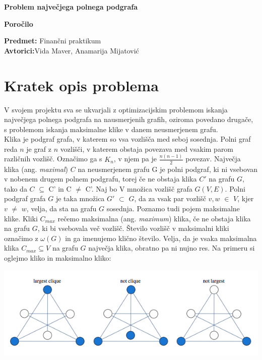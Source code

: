 \documentclass[12pt,a4paper]{amsart}
\newcommand{\naslovdela}{Problem največjega polnega podgrafa}
\newcommand{\imeavtorja}{Vida Maver, Anamarija Mijatović}
\theoremstyle{definition}
\theoremstyle{plain}
\begin{document}
\begin{center}{\large
\vspace*{\fill}
{\bf \LARGE{\naslovdela}}\\[10mm]}

\textbf{Poročilo}

\textbf{Predmet:} Finančni praktikum
\\
\textbf{Avtorici:}\imeavtorja\\[2mm]

\vspace*{\fill}
\end{center}
\pagebreak


\tableofcontents

\pagebreak

\section{Kratek opis problema}

V svojem projektu sva se ukvarjali z optimizacijskim problemom iskanja 
največjega polnega podgrafa na nausmerjenih grafih, oziroma povedano drugače, s problemom iskanja maksimalne klike v danem neusmerjenem grafu. \\

Klika je podgraf grafa, v katerem so vsa vozlišča med seboj sosednja. 
Polni graf reda $n$ je graf z $n$ vozlišči, v katerem obstaja povezava med vsakim parom različnih vozlišč. Označimo ga s $K_n$, v njem pa je $\frac{n(n - 1)}{2}$ povezav. 
Največja klika (ang. \textit{maximal}) $C$ na neusmerjenem grafu G je polni podgraf, ki ni vsebovan v nobenem drugem polnem podgrafu, torej če ne obstaja klika $C'$ na grafu $G$, tako da $C$ $\subseteq$ C' in C $\ne$ C'. 
Naj bo V množica vozlišč grafa $G(V, E)$. Polni podgraf grafa $G$ je taka množica $G'$ $\subset$ $G$, da za vsak par vozlišč $v, w$ $\in$ $V$, kjer $v$ $\ne$ $w$, velja, da sta na grafu $G$ sosednja. 
Poznamo tudi pojem maksimalne klike. Kliki $C_{max}$ rečemo maksimalna (ang. \textit{maximum}) klika, če ne obstaja klika na grafu $G$, ki bi vsebovala več vozlišč. 
Število vozlišč v maksimalni kliki označimo z $\omega(G)$ in ga imenujemo klično število. Velja, da je vsaka maksimalna klika $C_{max} \subseteq V$ na grafu $G$ največja klika, obratno pa ni nujno res. Na primeru si oglejmo kliko in maksimalno kliko:

\includegraphics[width=\textwidth]{cliques}
\end{document}
